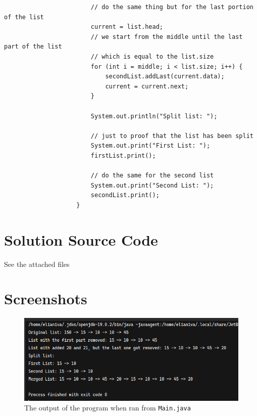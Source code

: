 \documentclass[12pt,titlepage]{article}
\begin{document}
\begin{enumerate}
{\begin{itemize}
{\begin{verbatim}
                        // do the same thing but for the last portion of the list
                        current = list.head;
                        // we start from the middle until the last part of the list
                        // which is equal to the list.size
                        for (int i = middle; i < list.size; i++) {
                            secondList.addLast(current.data);
                            current = current.next;
                        }

                        System.out.println("Split list: ");

                        // just to proof that the list has been split
                        System.out.print("First List: ");
                        firstList.print();

                        // do the same for the second list
                        System.out.print("Second List: ");
                        secondList.print();
                    }
                \end{verbatim}
            }
        \end{itemize}
    }
\end{enumerate}

\section{Solution Source Code}
See the attached files

\section{Screenshots}
\begin{figure}[h]
    \centering
    \includegraphics[width=\textwidth]{./images/output.png}
    \caption{The output of the program when ran from \texttt{Main.java}}
\end{figure}
\end{document}
